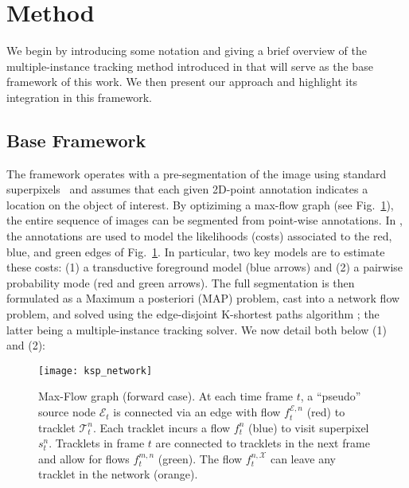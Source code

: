\section{Method}
\label{sec:method}
We begin by introducing some notation and giving a brief overview of the multiple-instance tracking method introduced in \cite{lejeune18} that will serve as the base framework of this work. We then present our approach and highlight its integration in this framework.

\subsection{Base Framework}
The framework operates with a pre-segmentation of the image using standard superpixels~\cite{achanta2012} and assumes that each given 2D-point annotation indicates a location on the object of interest. By optiziming a max-flow graph (see Fig.~\ref{fig:ksp_network}), the entire sequence of images can be segmented from point-wise annotations. In \cite{lejeune18}, the annotations are used to model the likelihoods (costs) associated to the red, blue, and green edges of Fig.~\ref{fig:ksp_network}. In particular, two key models are to estimate these costs: (1) a transductive foreground model (blue arrows) and (2) a pairwise probability mode (red and green arrows). The full segmentation is then formulated as a Maximum a posteriori (MAP) problem, cast into a network flow problem, and solved using the edge-disjoint K-shortest paths algorithm \cite{berclaz11}; the latter being a multiple-instance tracking solver. We now detail both below (1) and (2):
\begin{figure}[t]
\centering
\texttt{[image: ksp\_network]}
\caption{Max-Flow graph (forward case). At each time frame $t$, a ``pseudo'' source node $\mathcal{E}_t$ is connected via an edge with flow $f_{t}^{\mathcal{E},n}$ (red) to tracklet $\mathcal{T}_t^n$. Each tracklet incurs a flow $f_t^n$ (blue) to visit superpixel $s_t^n$. Tracklets in frame $t$ are connected to tracklets in the next frame and allow for flows $f_{t}^{m,n}$ (green). The flow $f_{t}^{n,\mathcal{X}}$ can leave any tracklet in the network (orange).}
\label{fig:ksp_network}
\end{figure}

